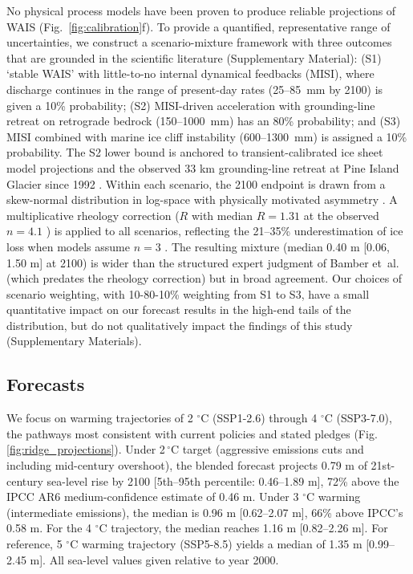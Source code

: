 \documentclass[12pt]{article}
\begin{document}
No physical process models have been proven to produce reliable projections of WAIS (Fig.~\ref{fig:calibration}f). To provide a quantified, representative range of uncertainties, we construct a scenario-mixture framework with three outcomes that are grounded in the scientific literature (Supplementary Material): (S1) `stable WAIS' with little-to-no internal dynamical feedbacks (MISI), where discharge continues in the range of present-day rates (25--85~mm by 2100) is given a 10\% probability; (S2) MISI-driven acceleration with grounding-line retreat on retrograde bedrock (150--1000~mm) has an 80\% probability; and (S3) MISI combined with marine ice cliff instability (600--1300~mm) is assigned a 10\% probability. The S2 lower bound is anchored to transient-calibrated ice sheet model projections \citep{Goldberg2026} and the observed 33 km grounding-line retreat at Pine Island Glacier since 1992 \citep{Rignot2026}. Within each scenario, the 2100 endpoint is drawn from a skew-normal distribution in log-space with physically motivated asymmetry \citep{Robel2019}. A multiplicative rheology correction ($R$ with median $R = 1.31$ at the observed $n = 4.1$ \citep{Millstein2022}) is applied to all scenarios, reflecting the 21--35\% underestimation of ice loss when models assume $n = 3$ \citep{Martin2026, GetraerMorlighem2025}. The resulting mixture (median 0.40 m [0.06, 1.50 m] at 2100) is wider than the structured expert judgment of Bamber et~al.~\citep{Bamber2019} (which predates the rheology correction) but in broad agreement. Our choices of scenario weighting, with 10-80-10\% weighting from S1 to S3, have a small quantitative impact on our forecast results in the high-end tails of the distribution, but do not qualitatively impact the findings of this study (Supplementary Materials).   

\subsection*{Forecasts}

We focus on warming trajectories of 2 $^\circ$C (SSP1-2.6) through 4 $^\circ$C (SSP3-7.0), the pathways most consistent with current policies and stated pledges (Fig. \ref{fig:ridge_projections}). Under 2$\,^\circ$C target (aggressive emissions cuts and including mid-century overshoot), the blended forecast projects 0.79 m of 21st-century sea-level rise by 2100 [5th--95th percentile: 0.46--1.89 m], 72\% above the IPCC AR6 medium-confidence estimate of 0.46 m. Under 3 $^\circ$C warming (intermediate emissions), the median is 0.96 m [0.62--2.07 m], 66\% above IPCC's 0.58 m. For the 4 $^\circ$C trajectory, the median reaches 1.16 m [0.82--2.26 m]. For reference, 5 $^\circ$C warming trajectory (SSP5-8.5) yields a median of 1.35 m [0.99--2.45 m]. All sea-level values given relative to year 2000.
\end{document}
